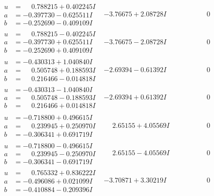 \documentclass[1p]{elsarticle_modified}
\theoremstyle{definition}
\begin{document}
$$\begin{array}{c|c|c}
\begin{aligned}
u &= \phantom{-}0.788215 + 0.402245 I \\
a &= -0.397730 - 0.625511 I \\
b &= -0.252690 - 0.409109 I\end{aligned}
 & -3.76675 + 2.08728 I & \phantom{-0.000000 } 0 \\ \hline\begin{aligned}
u &= \phantom{-}0.788215 - 0.402245 I \\
a &= -0.397730 + 0.625511 I \\
b &= -0.252690 + 0.409109 I\end{aligned}
 & -3.76675 - 2.08728 I & \phantom{-0.000000 } 0 \\ \hline\begin{aligned}
u &= -0.430313 + 1.040840 I \\
a &= \phantom{-}0.505748 + 0.188593 I \\
b &= \phantom{-}0.216466 - 0.014818 I\end{aligned}
 & -2.69394 - 0.61392 I & \phantom{-0.000000 } 0 \\ \hline\begin{aligned}
u &= -0.430313 - 1.040840 I \\
a &= \phantom{-}0.505748 - 0.188593 I \\
b &= \phantom{-}0.216466 + 0.014818 I\end{aligned}
 & -2.69394 + 0.61392 I & \phantom{-0.000000 } 0 \\ \hline\begin{aligned}
u &= -0.718800 + 0.496615 I \\
a &= \phantom{-}0.239945 + 0.250970 I \\
b &= -0.306341 + 0.691719 I\end{aligned}
 & \phantom{-}2.65155 + 4.05569 I & \phantom{-0.000000 } 0 \\ \hline\begin{aligned}
u &= -0.718800 - 0.496615 I \\
a &= \phantom{-}0.239945 - 0.250970 I \\
b &= -0.306341 - 0.691719 I\end{aligned}
 & \phantom{-}2.65155 - 4.05569 I & \phantom{-0.000000 } 0 \\ \hline\begin{aligned}
u &= \phantom{-}0.765332 + 0.836222 I \\
a &= -0.496086 + 0.021099 I \\
b &= -0.410884 - 0.209396 I\end{aligned}
 & -3.70871 + 3.30219 I & \phantom{-0.000000 } 0 \\ \hline\begin{aligned}

\end{aligned}
\end{array}$$
\end{document}
